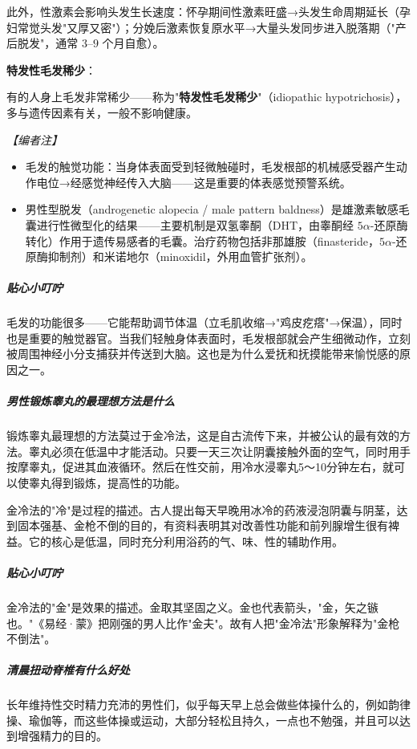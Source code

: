 此外，性激素会影响头发生长速度：怀孕期间性激素旺盛→头发生命周期延长（孕妇常觉头发"又厚又密"）；分娩后激素恢复原水平→大量头发同步进入脱落期（"产后脱发"，通常 $3$--$9$ 个月自愈）。

\vspace{0.5em}
\noindent\textbf{特发性毛发稀少}：

有的人身上毛发非常稀少——称为"\textbf{特发性毛发稀少}"（idiopathic hypotrichosis），多与遗传因素有关，一般不影响健康。

\vspace{0.5em}
\noindent\textit{【编者注】}
\begin{itemize}
	\item 毛发的触觉功能：当身体表面受到轻微触碰时，毛发根部的机械感受器产生动作电位→经感觉神经传入大脑——这是重要的体表感觉预警系统。
	\item 男性型脱发（androgenetic alopecia / male pattern baldness）是雄激素敏感毛囊进行性微型化的结果——主要机制是双氢睾酮（DHT，由睾酮经 $5\alpha$-还原酶转化）作用于遗传易感者的毛囊。治疗药物包括非那雄胺（finasteride，$5\alpha$-还原酶抑制剂）和米诺地尔（minoxidil，外用血管扩张剂）。
\end{itemize}

\subparagraph{贴心小叮咛}

毛发的功能很多——它能帮助调节体温（立毛肌收缩→"鸡皮疙瘩"→保温），同时也是重要的触觉器官。当我们轻触身体表面时，毛发根部就会产生细微动作，立刻被周围神经小分支捕获并传送到大脑。这也是为什么爱抚和抚摸能带来愉悦感的原因之一。

\subparagraph{男性锻炼睾丸的最理想方法是什么}

锻炼睾丸最理想的方法莫过于金冷法，这是自古流传下来，并被公认的最有效的方法。睾丸必须在低温中才能活动。只要一天三次让阴囊接触外面的空气，同时用手按摩睾丸，促进其血液循环。然后在性交前，用冷水浸睾丸5～10分钟左右，就可以使睾丸得到锻炼，提高性的功能。

金冷法的"冷"是过程的描述。古人提出每天早晚用冰冷的药液浸泡阴囊与阴茎，达到固本强基、金枪不倒的目的，有资料表明其对改善性功能和前列腺增生很有裨益。它的核心是低温，同时充分利用浴药的气、味、性的辅助作用。

\subparagraph{贴心小叮咛}

金冷法的"金"是效果的描述。金取其坚固之义。金也代表箭头，"金，矢之镞也。"《易经·蒙》把刚强的男人比作"金夫"。故有人把"金冷法"形象解释为"金枪不倒法"。

\subparagraph{清晨扭动脊椎有什么好处}

长年维持性交时精力充沛的男性们，似乎每天早上总会做些体操什么的，例如韵律操、瑜伽等，而这些体操或运动，大部分轻松且持久，一点也不勉强，并且可以达到增强精力的目的。

